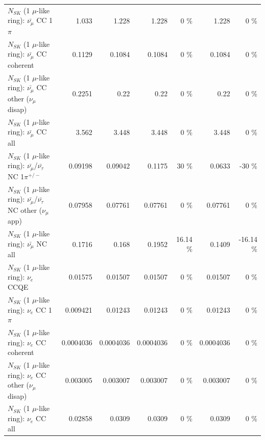 \begin{table}
\begin{tabular}{| l | r | r | r  r | r  r |}
                         $N_{SK}$ (1 $\mu$-like ring): $\bar{\nu_\mu}$ CC 1$\pi$ &           1.033 &           1.228 &           1.228 &        0 \%  &           1.228 &        0 \%  \\ 
                       $N_{SK}$ (1 $\mu$-like ring): $\bar{\nu_\mu}$ CC coherent &          0.1129 &          0.1084 &          0.1084 &        0 \%  &          0.1084 &        0 \%  \\ 
        $N_{SK}$ (1 $\mu$-like ring): $\bar{\nu_\mu}$ CC other ($\nu_\mu$ disap) &          0.2251 &            0.22 &            0.22 &        0 \%  &            0.22 &        0 \%  \\ 
                          $N_{SK}$ (1 $\mu$-like ring): $\bar{\nu_{\mu}}$ CC all &           3.562 &           3.448 &           3.448 &        0 \%  &           3.448 &        0 \%  \\ 
\hline
  $N_{SK}$ (1 $\mu$-like ring): $\bar{\nu_\mu}$/$\bar{\nu_\tau}$ NC 1$\pi^{+/-}$ &         0.09198 &         0.09042 &          0.1175 &       30 \%  &          0.0633 &      -30 \%  \\ 
$N_{SK}$ (1 $\mu$-like ring): $\bar{\nu_\mu}$/$\bar{\nu_\tau}$ NC other ($\nu_\mu$ app) &         0.07958 &         0.07761 &         0.07761 &        0 \%  &         0.07761 &        0 \%  \\ 
                          $N_{SK}$ (1 $\mu$-like ring): $\bar{\nu_{\mu}}$ NC all &          0.1716 &           0.168 &          0.1952 &    16.14 \%  &          0.1409 &   -16.14 \%  \\ 
\hline
\hline
\hline
                                      $N_{SK}$ (1 $\mu$-like ring): $\nu_e$ CCQE &         0.01575 &         0.01507 &         0.01507 &        0 \%  &         0.01507 &        0 \%  \\ 
                                 $N_{SK}$ (1 $\mu$-like ring): $\nu_e$ CC 1$\pi$ &        0.009421 &         0.01243 &         0.01243 &        0 \%  &         0.01243 &        0 \%  \\ 
                               $N_{SK}$ (1 $\mu$-like ring): $\nu_e$ CC coherent &       0.0004036 &       0.0004036 &       0.0004036 &        0 \%  &       0.0004036 &        0 \%  \\ 
                $N_{SK}$ (1 $\mu$-like ring): $\nu_e$ CC other ($\nu_\mu$ disap) &        0.003005 &        0.003007 &        0.003007 &        0 \%  &        0.003007 &        0 \%  \\ 
                                  $N_{SK}$ (1 $\mu$-like ring): $\nu_{e}$ CC all &         0.02858 &          0.0309 &          0.0309 &        0 \%  &          0.0309 &        0 \%  \\ 

\end{tabular}
\end{table}
